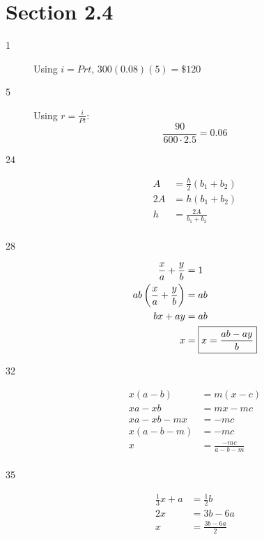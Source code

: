 \documentclass[letterpaper]{exam}
\begin{document}
    \section{Section 2.4} %
    \begin{description}
      
      \item[1] Using $i = Prt$, $300(0.08)(5) = \boxed{ \$120 }$

      \item[5] Using $r = \frac{i}{Pt}$:
        \[
          \frac{90}{600 \cdot 2.5} = \boxed{ 0.06 } 
        \]

      \item[24]
        \begin{align*}
          A  & = \frac{h}{2} (b_1 + b_2) \\
          2A & = h(b_1 + b_2) \\
          h  & = \boxed{ \frac{2A}{b_1 + b_2} } \\
        \end{align*}

      \item[28]
      \begin{align*}
        \frac{x}{a} + \frac{y}{b}            & = 1 \\
        ab \del{ \frac{x}{a} + \frac{y}{b} } & = ab  \\
        bx + ay                              & =ab \\
        x                                    & = \boxed{ x = \frac{ab - ay}{b} } \\
      \end{align*}

      \item[32]
        \begin{align*}
          x(a-b)   & = m(x-c) \\
          xa-xb    & = mx-mc \\
          xa-xb-mx & = -mc \\
          x(a-b-m) & = -mc \\
          x        & = \boxed{ \frac{-mc}{a - b - m} } \\
        \end{align*}

      \item[35]
      \begin{align*}
        \frac{1}{3}x + a & = \frac{1}{2}b \\
        2x               & = 3b - 6a \\
        x                & = \boxed{ \frac{3b - 6a}{2} } \\
      \end{align*}


\end{description}
\end{document}
